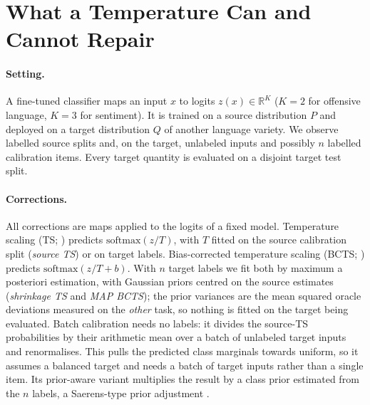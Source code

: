 \section{What a Temperature Can and Cannot Repair}
\label{sec:problem-setting}

\paragraph{Setting.}
A fine-tuned classifier maps an input $x$ to logits $z(x) \in \mathbb{R}^K$ ($K = 2$ for offensive language, $K = 3$
for sentiment). It is trained on a source distribution $P$ and deployed on a target distribution $Q$ of another
language variety. We observe labelled source splits and, on the target, unlabeled inputs and possibly $n$ labelled
calibration items. Every target quantity is evaluated on a disjoint target test split.

\paragraph{Corrections.}
All corrections are maps applied to the logits of a fixed model. Temperature scaling (TS; \citealp{guo2017calibration})
predicts $\mathrm{softmax}(z/T)$, with $T$ fitted on the source calibration split (\emph{source TS}) or on target labels.
Bias-corrected temperature scaling (BCTS; \citealp{alexandari2020maximum}) predicts $\mathrm{softmax}(z/T + b)$. With
$n$ target labels we fit both by maximum a posteriori estimation, with Gaussian priors centred on the source estimates
(\emph{shrinkage TS} and \emph{MAP BCTS}); the prior variances are the mean squared oracle deviations measured on the
\emph{other} task, so nothing is fitted on the target being evaluated. Batch calibration \citep{zhou2024batch} needs no
labels: it divides the source-TS probabilities by their arithmetic mean over a batch of unlabeled target inputs and renormalises.
This pulls the predicted class marginals towards uniform, so it assumes a balanced target and needs a batch of target
inputs rather than a single item. Its prior-aware variant
multiplies the result by a class prior estimated from the $n$ labels, a Saerens-type prior adjustment
\citep{saerens2002adjusting}.

